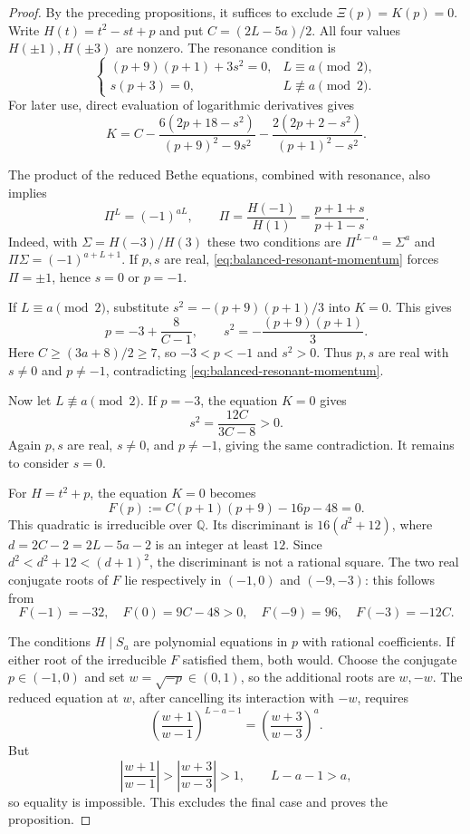 \documentclass[11pt]{article}
\theoremstyle{definition}
\begin{document}
\begin{proof}
By the preceding propositions, it suffices to exclude
$\Xi(p)=K(p)=0$. Write $H(t)=t^2-st+p$ and put
$C=(2L-5a)/2$. All four values $H(\pm1),H(\pm3)$ are nonzero.
The resonance condition is
\begin{equation}\label{eq:two-additional-resonance}
 \begin{cases}
 (p+9)(p+1)+3s^2=0,&L\equiv a\pmod2,\\
 s(p+3)=0,&L\not\equiv a\pmod2.
 \end{cases}
\end{equation}
For later use, direct evaluation of logarithmic derivatives gives
\[
 K=C-\frac{6(2p+18-s^2)}{(p+9)^2-9s^2}
       -\frac{2(2p+2-s^2)}{(p+1)^2-s^2}.
\]

The product of the reduced Bethe equations, combined with resonance,
also implies
\begin{equation}\label{eq:balanced-resonant-momentum}
 \Pi^L=(-1)^{aL},\qquad
 \Pi=\frac{H(-1)}{H(1)}=\frac{p+1+s}{p+1-s}.
\end{equation}
Indeed, with $\Sigma=H(-3)/H(3)$ these two conditions are
$\Pi^{L-a}=\Sigma^a$ and $\Pi\Sigma=(-1)^{a+L+1}$.
If $p,s$ are real, \eqref{eq:balanced-resonant-momentum} forces
$\Pi=\pm1$, hence $s=0$ or $p=-1$.

If $L\equiv a\pmod2$, substitute
$s^2=-(p+9)(p+1)/3$ into $K=0$. This gives
\[
 p=-3+\frac8{C-1},\qquad
 s^2=-\frac{(p+9)(p+1)}3.
\]
Here $C\ge(3a+8)/2\ge7$, so $-3<p<-1$ and $s^2>0$.
Thus $p,s$ are real with $s\ne0$ and $p\ne-1$, contradicting
\eqref{eq:balanced-resonant-momentum}.

Now let $L\not\equiv a\pmod2$. If $p=-3$, the equation $K=0$
gives
\[
 s^2=\frac{12C}{3C-8}>0.
\]
Again $p,s$ are real, $s\ne0$, and $p\ne-1$, giving the same
contradiction. It remains to consider $s=0$.

For $H=t^2+p$, the equation $K=0$ becomes
\begin{equation}\label{eq:two-additional-quadratic-obstruction}
 F(p):=C(p+1)(p+9)-16p-48=0.
\end{equation}
This quadratic is irreducible over $\mathbb Q$. Its discriminant is
$16(d^2+12)$, where $d=2C-2=2L-5a-2$ is an integer at least $12$.
Since $d^2<d^2+12<(d+1)^2$, the discriminant is not a rational
square. The two real conjugate roots of $F$ lie respectively in
$(-1,0)$ and $(-9,-3)$: this follows from
\[
 F(-1)=-32,\quad F(0)=9C-48>0,\quad
 F(-9)=96,\quad F(-3)=-12C.
\]

The conditions $H\mid S_a$ are polynomial equations in $p$ with
rational coefficients. If either root of the irreducible $F$ satisfied
them, both would. Choose the conjugate $p\in(-1,0)$ and set
$w=\sqrt{-p}\in(0,1)$, so the additional roots are $w,-w$.
The reduced equation at $w$, after cancelling its interaction with
$-w$, requires
\[
 \left(\frac{w+1}{w-1}\right)^{L-a-1}
 =\left(\frac{w+3}{w-3}\right)^a.
\]
But
\[
 \left|\frac{w+1}{w-1}\right|
 >\left|\frac{w+3}{w-3}\right|>1,
 \qquad L-a-1>a,
\]
so equality is impossible. This excludes the final case and proves
the proposition.
\end{proof}
\end{document}
